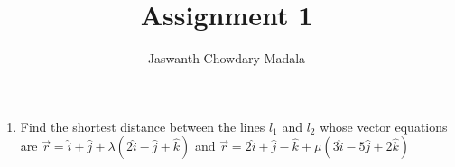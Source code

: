 \documentclass[journal,12pt,twocolumn]{IEEEtran}
\begin{document}
\vspace{3cm}


\title{Assignment 1}
\author{Jaswanth Chowdary Madala}





\maketitle

\newpage


\bigskip

\renewcommand{\thefigure}{\theenumi}
\renewcommand{\thetable}{\theenumi}

\begin{enumerate}
\item Find the shortest distance between the lines $l_1$ and $l_2$ whose vector equations are ${\overrightarrow{r} = \hat{i}+\hat{j}+\lambda(2\hat{i}-\hat{j}+\hat{k})}$ and ${\overrightarrow{r} = 2\hat{i}+\hat{j}-\hat{k}+\mu(3\hat{i}-5\hat{j}+2\hat{k})}$


\end{enumerate}
\end{document}
